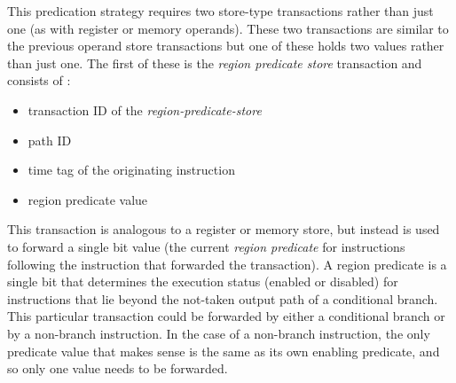 \documentclass{book}
\begin{document}
This predication strategy requires two store-type transactions
rather than just one (as with register or memory operands).  
These two transactions are similar
to the previous operand store transactions 
but one of these holds two values rather than just one.
The first of these is the \textit{region predicate store}
transaction and consists of :
%
\begin{itemize}
\vspace{-0.10in}
\item{transaction ID of the \textit{region-predicate-store}}
\vspace{-0.10in}
\item{path ID}
\vspace{-0.10in}
\item{time tag of the originating instruction}
\vspace{-0.10in}
\item{region predicate value}
\vspace{-0.10in}
\end{itemize}   
%
This transaction is analogous to a register or memory
store, but instead is used to forward a single bit value (the
current \textit{region predicate} for instructions following the
instruction that forwarded the transaction).  A region predicate
is a single bit that determines the execution status
(enabled or disabled) for instructions that lie beyond the
not-taken output path of a conditional branch.
This particular transaction could be forwarded by either
a conditional branch or by a non-branch instruction.
In the
case of a non-branch instruction, the only
predicate value that makes sense is the same as its
own enabling predicate, and so only one value needs
to be forwarded.
\end{document}
